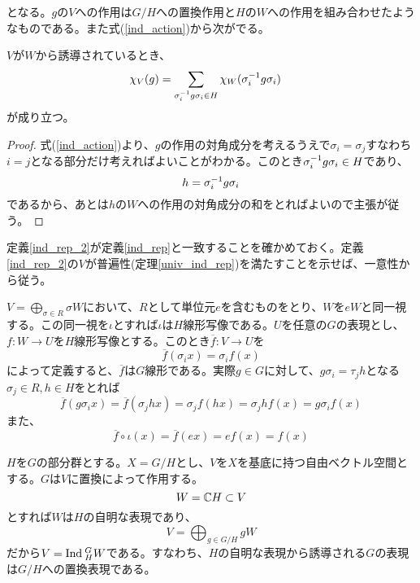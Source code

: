 \documentclass{ltjsreport}
\begin{document}
となる。$g$の$V$への作用は$G/H$への置換作用と$H$の$W$への作用を組み合わせたようなものである。また式(\ref{ind_action})から次がでる。

\begin{prop}[誘導表現の指標]\label{ind_char}
  $V$が$W$から誘導されているとき、
  \begin{align}
  \chi_V(g)&=\sum_{\sigma_i^{-1}g\sigma_i\in H}\chi_W(\sigma_i^{-1}g\sigma_i)
\end{align}
が成り立つ。
\end{prop}

\begin{proof}
  式(\ref{ind_action})より、$g$の作用の対角成分を考えるうえで$\sigma_i=\sigma_j$すなわち$i=j$となる部分だけ考えればよいことがわかる。このとき$\sigma_i^{-1}g\sigma_i\in H$であり、
  \[
  h=\sigma_i^{-1}g\sigma_i 
  \]
  であるから、あとは$h$の$W$への作用の対角成分の和をとればよいので主張が従う。
\end{proof}

定義\ref{ind_rep_2}が定義\ref{ind_rep}と一致することを確かめておく。定義\ref{ind_rep_2}の$V$が普遍性(定理\ref{univ_ind_rep})を満たすことを示せば、一意性から従う。

$V=\bigoplus_{\sigma\in R}\sigma W$において、$R$として単位元$e$を含むものをとり、$W$を$eW$と同一視する。この同一視を$\iota$とすれば$\iota$は$H$線形写像である。$U$を任意の$G$の表現とし、$f:W\rightarrow U$を$H$線形写像とする。このとき$\overline{f}:V\rightarrow U$を
\[
\overline{f}(\sigma_i x)=\sigma_i f(x)
\]
によって定義すると、$\overline{f}$は$G$線形である。実際$g\in G$に対して、$g\sigma_i =\tau_j h$となる$\sigma_j\in R, h\in H$をとれば
\[
\overline{f}(g\sigma_i x)=\overline{f}(\sigma_j hx)=\sigma_jf(hx)=\sigma_jhf(x)=g\sigma_if(x)  
\]
また、
\[
\overline{f}\circ\iota(x)=\overline{f}(ex)=ef(x)=f(x)  
\]



\begin{eg}
  $H$を$G$の部分群とする。$X=G/H$とし、$V$を$X$を基底に持つ自由ベクトル空間とする。$G$は$V$に置換によって作用する。
  \[
  W=\mathbb{C} H\subset V  
  \]
  とすれば$W$は$H$の自明な表現であり、
  \[
  V=\bigoplus_{g\in G/H}gW
  \]
  だから$V=\text{Ind}\:_H^GW$である。すなわち、$H$の自明な表現から誘導される$G$の表現は$G/H$への置換表現である。
\end{eg}
\end{document}
